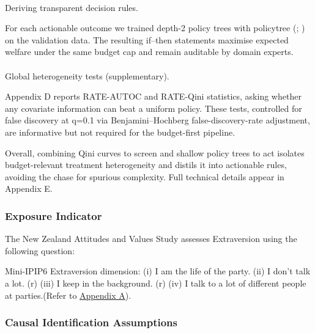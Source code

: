 \documentclass[
  single column]{article}
\makeatletter
\let\oldparagraph\paragraph
\renewcommand{\paragraph}{
    \@ifstar
      \xxxParagraphStar
      \xxxParagraphNoStar
  }
\newcommand{\xxxParagraphStar}[1]{\oldparagraph*{#1}\mbox{}}
\newcommand{\xxxParagraphNoStar}[1]{\oldparagraph{#1}\mbox{}}
\makeatother
\begin{document}
\paragraph{Deriving transparent decision
rules.}\label{deriving-transparent-decision-rules.}

For each actionable outcome we trained depth-2 policy trees with
policytree (; ) on the validation data. The resulting if--then statements
maximise expected welfare under the same budget cap and remain auditable
by domain experts.

\paragraph{Global heterogeneity tests
(supplementary).}\label{global-heterogeneity-tests-supplementary.}

Appendix D reports RATE-AUTOC and RATE-Qini statistics, asking whether
any covariate information can beat a uniform policy. These tests,
controlled for false discovery at q=0.1 via Benjamini--Hochberg
false-discovery-rate adjustment, are informative but not required for
the budget-first pipeline.

Overall, combining Qini curves to screen and shallow policy trees to act
isolates budget-relevant treatment heterogeneity and distils it into
actionable rules, avoiding the chase for spurious complexity. Full
technical details appear in Appendix E.

\subsubsection{Exposure Indicator}\label{exposure-indicator}

The New Zealand Attitudes and Values Study assesses Extraversion using
the following question:

Mini-IPIP6 Extraversion dimension: (i) I am the life of the party. (ii)
I don't talk a lot. (r) (iii) I keep in the background. (r) (iv) I talk
to a lot of different people at parties.(Refer to
\hyperref[appendix-measures]{Appendix A}).

\subsubsection{Causal Identification
Assumptions}\label{causal-identification-assumptions}
\end{document}
